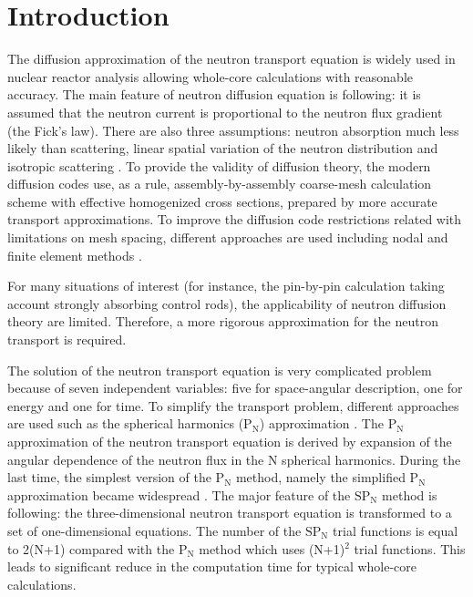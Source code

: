 \documentclass[authoryear]{elsarticle}
\begin{document}
\section{Introduction}
The diffusion approximation of the neutron transport equation is widely used in nuclear reactor analysis allowing whole-core calculations with reasonable accuracy. 
The main feature of neutron diffusion equation is following: it is assumed that the neutron current is proportional to the neutron flux gradient (the Fick’s law). 
There are also three assumptions: neutron absorption much less likely than scattering, linear spatial variation of the neutron distribution and isotropic scattering \citep{stacey2007}. 
To provide the validity of diffusion theory, the modern diffusion codes use, as a rule, assembly-by-assembly coarse-mesh calculation scheme with effective homogenized cross sections, prepared by more accurate transport approximations. 
To improve the diffusion code restrictions related with limitations on mesh spacing, different approaches are used including nodal and finite element methods \citep{avvakumov2017spectral, lawrence1986progress}.

For many situations of interest (for instance, the pin-by-pin calculation taking account strongly absorbing control rods), the applicability of neutron diffusion theory are limited. 
Therefore, a more rigorous approximation for the neutron transport is required.

The solution of the neutron transport equation is very complicated problem because of seven independent variables: five for space-angular description, one for energy and one for time. 
To simplify the transport problem, different approaches are used such as the spherical harmonics ($\mathrm{P_N}$) approximation \citep{azmy2010nuclear}. 
The $\mathrm{P_N}$ approximation of the neutron transport equation is derived by expansion of the angular dependence of the neutron flux in the N spherical harmonics. 
During the last time, the simplest version of the $\mathrm{P_N}$ method, namely the simplified $\mathrm{P_N}$ approximation became widespread \citep{mcclarren2010theoretical}. 
The major feature of the $\mathrm{SP_N}$ method is following: the three-dimensional neutron transport equation is transformed to a set of one-dimensional equations. 
The number of the $\mathrm{SP_N}$ trial functions is equal to 2(N+1) compared with the $\mathrm{P_N}$ method which uses (N+1)$^2$ trial functions. 
This leads to significant reduce in the computation time for typical whole-core calculations. 
\end{document}
